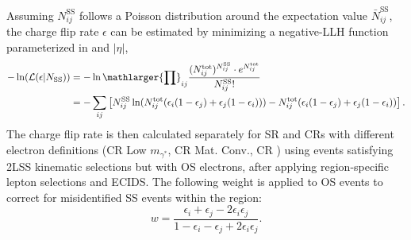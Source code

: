 \documentclass[../thesis.tex]{subfiles}
\begin{document}
Assuming $N_{ij}^\mathrm{SS}$ follows a Poisson distribution around the expectation value $\bar{N}_{ij}^\mathrm{SS}$, the charge flip rate $\epsilon$ can be estimated by minimizing a negative-LLH function parameterized in \pT and $|\eta|$,
\begin{align}
-\ln (\mathcal{L}(\epsilon | N_\mathrm{SS})) 
&= -\ln \mathlarger{\prod}_{ij} \frac{(N_{ij}^\mathrm{tot})^{N_{ij}^\mathrm{SS}} \cdot e^{N_{ij}^\mathrm{tot}}}{N_{ij}^\mathrm{SS}!} \\
&= -\sum_{ij} \left[
N_{ij}^\mathrm{SS} \ln (
N_{ij}^\mathrm{tot}( \epsilon_i(1-\epsilon_j)+\epsilon_j(1-\epsilon_i) )) - 
N_{ij}^\mathrm{tot}( \epsilon_i(1-\epsilon_j)+\epsilon_j(1-\epsilon_i) ) \right].
\end{align}
The charge flip rate is then calculated separately for SR and CRs with different electron definitions (CR Low $m_{\gamma^{*}}$, CR Mat. Conv., CR \ttW) using events satisfying 2LSS kinematic selections but with OS electrons, after applying region-specific lepton selections and ECIDS. The following weight is applied to OS events to correct for misidentified SS events within the region:
\begin{equation}
w = \frac{\epsilon_i+\epsilon_j-2\epsilon_i\epsilon_j}{1-\epsilon_i-\epsilon_j+2\epsilon_i\epsilon_j}.
\end{equation}
\end{document}
